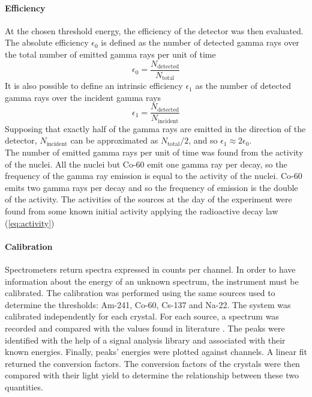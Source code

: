 \documentclass[a4paper, 11pt, table]{article}
\begin{document}
\paragraph{Efficiency}
At the chosen threshold energy, the efficiency of the detector was then evaluated. The absolute efficiency $\epsilon_0$ is defined as the number of detected gamma rays over the total number of emitted gamma rays per unit of time
\begin{equation} \label{eq:efficiency}
    \epsilon_0 = \frac{N_\text{detected}}{N_\text{total}}
\end{equation}
It is also possible to define an intrinsic efficiency $\epsilon_1$ as the number of detected gamma rays over the incident gamma rays
\begin{equation} \label{eq:intrinsic_efficiency}
    \epsilon_1 = \frac{N_\text{detected}}{N_\text{incident}}
\end{equation}
Supposing that exactly half of the gamma rays are emitted in the direction of the detector, $N_\text{incident}$ can be approximated as $N_\text{total} / 2$, and so $\epsilon_1 \approx 2\epsilon_0$.\\

The number of emitted gamma rays per unit of time was found from the activity of the nuclei. All the nuclei but Co-60 emit one gamma ray per decay, so the frequency of the gamma ray emission is equal to the activity of the nuclei. Co-60 emits two gamma rays per decay and so the frequency of emission is the double of the activity. The activities of the sources at the day of the experiment were found from some known initial activity applying the radioactive decay law (\cref{eq:activity})

\paragraph{Calibration}
Spectrometers return spectra expressed in counts per channel. In order to have information about the energy of an unknown spectrum, the instrument must be calibrated. The calibration was performed using the same sources used to determine the thresholds: Am-241, Co-60, Cs-137 and Na-22. The system was calibrated independently for each crystal. For each source, a spectrum was recorded and compared with the values found in literature \cite{heath_scintillation_1964}. The peaks were identified with the help of a signal analysis library \cite{2020SciPy-NMeth} and associated with their known energies. Finally, peaks' energies were plotted against channels. A linear fit returned the conversion factors. The conversion factors of the crystals were then compared with their light yield to determine the relationship between these two quantities.
\end{document}
